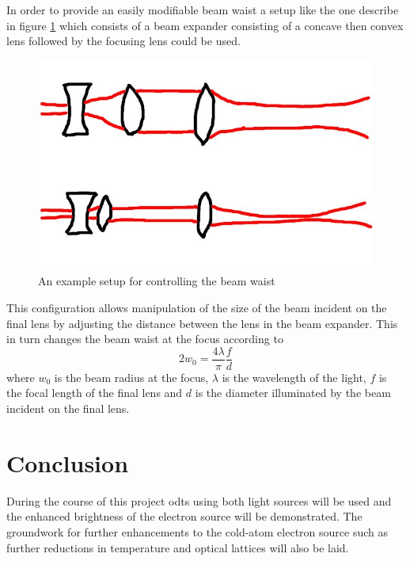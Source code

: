 In order to provide an easily modifiable beam waist a setup like the one describe in figure \ref{figs/MOT.pdf} which consists of a beam expander consisting of a concave then convex lens followed by the focusing lens could be used.

\begin{figure}[h]
	\centering
	\includegraphics[scale=0.32]{figs/waistcontrol.jpg}
	\caption[Title]{An example setup for controlling the beam waist}
	\label{figs/MOT.pdf}
\end{figure}

This configuration allows manipulation of the size of the beam incident on the final lens by adjusting the distance between the lens in the beam expander. This in turn changes the beam waist at the focus according to
\begin{equation}
2w_0=\frac{4\lambda}{\pi}\frac{f}{d}
\end{equation}
where $w_0$ is the beam radius at the focus, $\lambda$ is the wavelength of the light, $f$ is the focal length of the final lens and $d$ is the diameter illuminated by the beam incident on the final lens.

\section{Conclusion}
During the course of this project \glspl{odt} using both light sources will be used and the enhanced brightness of the electron source will be demonstrated. The groundwork for further enhancements to the cold-atom electron source such as further reductions in temperature and optical lattices will also be laid.
